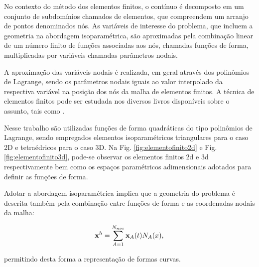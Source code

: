 \documentclass[tese_patricia]{subfiles}%
\begin{document}
No contexto do método dos elementos finitos, o contínuo é decomposto em um conjunto de subdomínios chamados de elementos, que compreendem um arranjo de pontos denominados nós. As variáveis de interesse do problema, que incluem a geometria na abordagem isoparamétrica, são aproximadas pela combinação linear de um número finito de funções associadas aos nós, chamadas funções de forma, multiplicadas por variáveis chamadas parâmetros nodais.

A aproximação das variáveis nodais é realizada, em geral através dos polinômios de Lagrange, sendo os parâmetros nodais iguais ao valor interpolado da respectiva variável na posição dos nós da malha de elementos finitos. A técnica de elementos finitos pode ser estudada nos diversos livros disponíveis sobre o assunto, tais como .

Nesse trabalho são utilizadas funções de forma quadráticas do tipo polinômios de Lagrange, sendo empregados elementos isoparamétricos triangulares para o caso 2D e tetraédricos para o caso 3D. Na Fig. \ref{fig:elementofinito2d} e Fig. \ref{fig:elementofinito3d}, pode-se observar os elementos finitos 2d e 3d respectivamente bem como os espaços paramétricos adimensionais adotados para definir as funções de forma. 

Adotar a abordagem isoparamétrica implica que a geometria do problema é descrita também pela combinação entre funções de forma e as coordenadas nodais da malha:

\begin{align}
\mathbf{x}^{h} = \sum_{A = 1}^{N_{nos}} \mathbf{x}_{A}(t)N_{A}(x),
\end{align}

\noindent permitindo desta forma a representação de formas curvas.
\end{document}
